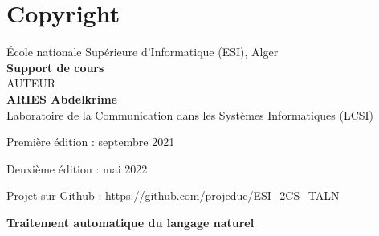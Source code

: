 \documentclass[12pt]{book}
\begin{document}
\fi



\chapter*{Copyright}

\begin{center}
	École nationale Supérieure d'Informatique (ESI), Alger \\
	\textbf{Support de cours} \\[1cm]
	{\Large AUTEUR}\\[.5cm]
	{\LARGE\bfseries ARIES Abdelkrime}\\
	Laboratoire de la Communication dans les Systèmes Informatiques (LCSI)
\end{center}

Première édition : septembre 2021

Deuxième édition : mai 2022

Projet sur Github : \url{https://github.com/projeduc/ESI_2CS_TALN}


\begin{center}
	{\Huge \textbf{Traitement automatique du langage naturel}}
\end{center}
\end{document}
